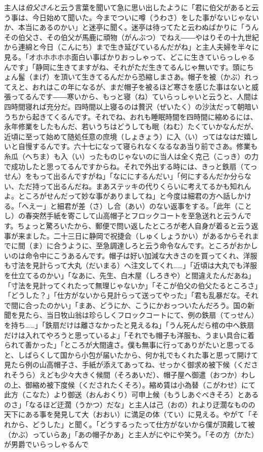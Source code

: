 \documentclass{book}
\begin{document}
主人は\emph{伯父さん}と云う言葉を聞いて急に思い出したように「君に伯父があると云う事は、今日始めて聞いた。今までついに噂（うわさ）をした事がないじゃないか、本当にあるのかい」と迷亭に聞く。迷亭は待ってたと云わぬばかりに「うんその伯父さ、その伯父が馬鹿に頑物（がんぶつ）でねえ――やはりその十九世紀から連綿と今日（こんにち）まで生き延びているんだがね」と主人夫婦を半々に見る。「オホホホホホ面白い事ばかりおっしゃって、どこに生きていらっしゃるんです」「静岡に生きてますがね、それがただ生きてるんじゃ無いです。頭にちょん髷（まげ）を頂いて生きてるんだから恐縮しまさあ。帽子を被（かぶ）れってえと、おれはこの年になるが、まだ帽子を被るほど寒さを感じた事はないと威張ってるんです――寒いから、もっと寝（ね）ていらっしゃいと云うと、人間は四時間寝れば充分だ。四時間以上寝るのは贅沢（ぜいたく）の沙汰だって朝暗いうちから起きてくるんです。それでね、おれも睡眠時間を四時間に縮めるには、永年修業をしたもんだ、若いうちはどうしても眠（ねむ）たくていかなんだが、近頃に至って始めて随処任意の庶境（しょきょう）に入（い）ってはなはだ嬉しいと自慢するんです。六十七になって寝られなくなるなあ当り前でさあ。修業も糸瓜（へちま）も入（い）ったものじゃないのに当人は全く克己（こっき）の力で成功したと思ってるんですからね。それで外出する時には、きっと鉄扇（てっせん）をもって出るんですがね」「なににするんだい」「何にするんだか分らない、ただ持って出るんだね。まあステッキの代りくらいに考えてるかも知れんよ。ところがせんだって妙な事がありましてね」と今度は細君の方へ話しかける。「へえー」と細君が差（さ）し合（あい）のない返事をする。「此年（ことし）の春突然手紙を寄こして山高帽子とフロックコートを至急送れと云うんです。ちょっと驚ろいたから、郵便で問い返したところが老人自身が着ると云う返事が来ました。二十三日に静岡で祝捷会（しゅくしょうかい）があるからそれまでに間（ま）に合うように、至急調達しろと云う命令なんです。ところがおかしいのは命令中にこうあるんです。帽子は好い加減な大きさのを買ってくれ、洋服も寸法を見計らって大丸（だいまる）へ注文してくれ\ldots{}\ldots{}」「近頃は大丸でも洋服を仕立てるのかい」「なあに、先生、白木屋（しろきや）と間違えたんだあね」「寸法を見計ってくれたって無理じゃないか」「そこが伯父の伯父たるところさ」「どうした？」「仕方がないから見計らって送ってやった」「君も乱暴だな。それで間に合ったのかい」「まあ、どうにか、こうにかおっついたんだろう。国の新聞を見たら、当日牧山翁は珍らしくフロックコートにて、例の鉄扇（てっせん）を持ち\ldots{}\ldots{}」「鉄扇だけは離さなかったと見えるね」「うん死んだら棺の中へ鉄扇だけは入れてやろうと思っているよ」「それでも帽子も洋服も、うまい具合に着られて善かった」「ところが大間違さ。僕も無事に行ってありがたいと思ってると、しばらくして国から小包が届いたから、何か礼でもくれた事と思って開けて見たら例の山高帽子さ、手紙が添えてあってね、せっかく御求め被下候（くだされそうら）えども少々大きく候間（そろあいだ）、帽子屋へ御遣（おつか）わしの上、御縮め被下度候（くだされたくそろ）。縮め賃は小為替（こがわせ）にて此方（こなた）より御送（おんおくり）可申上候（もうしあぐべきそろ）とあるのさ」「なるほど迂濶（うかつ）だな」と主人は己（おの）れより迂濶なものの天下にある事を発見して大（おおい）に満足の体（てい）に見える。やがて「それから、どうした」と聞く。「どうするったって仕方がないから僕が頂戴して被（かぶ）っていらあ」「あの帽子かあ」と主人がにやにや笑う。「その方（かた）が男爵でいらっしゃるんで
\end{document}
